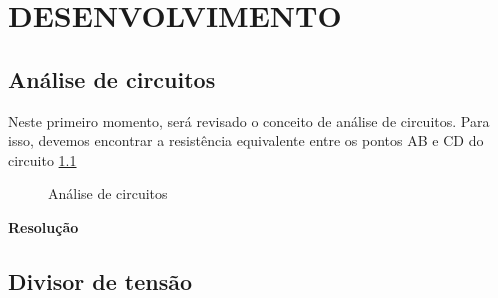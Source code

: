 \chapter{DESENVOLVIMENTO}

\section{Análise de circuitos}

Neste primeiro momento, será revisado o conceito de análise de circuitos. Para isso, devemos encontrar a resistência equivalente entre os pontos AB e CD do circuito \ref{fig:AnaliseDeCircuitos}

\begin{figure}[ht]
    \centering
    \caption{Análise de circuitos}
    \vspace{-0.3cm}
    \label{fig:AnaliseDeCircuitos}
\end{figure}

\noindent
\textbf{Resolução}

\begin{Resolucao}[ht]
    \label{res:AnaliseDeCircuitos}
\end{Resolucao}

\section{Divisor de tensão}

